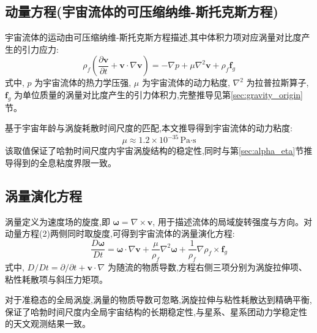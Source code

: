 \documentclass[11pt,a4paper]{article}
\def\grad{\nabla}
\def\curl{\nabla\times}
\begin{document}
\subsection{动量方程(宇宙流体的可压缩纳维-斯托克斯方程)}
宇宙流体的运动由可压缩纳维-斯托克斯方程描述,其中体积力项对应涡量对比度产生的引力应力:
\begin{equation}
\rho_f \left( \frac{\partial \boldsymbol{v}}{\partial t} + \boldsymbol{v} \cdot \grad \boldsymbol{v} \right) = - \grad p + \mu \grad^2 \boldsymbol{v} + \rho_f \boldsymbol{f}_g
\end{equation}
式中, $p$ 为宇宙流体的热力学压强, $\mu$ 为宇宙流体的动力粘度, $\grad^2$ 为拉普拉斯算子, $\boldsymbol{f}_g$ 为单位质量的涡量对比度产生的引力体积力,完整推导见第\ref{sec:gravity_origin}节。

基于宇宙年龄与涡旋耗散时间尺度的匹配,本文推导得到宇宙流体的动力粘度:
\begin{equation}
\mu \approx 1.2 \times 10^{-35} \, \text{Pa·s}
\end{equation}
该取值保证了哈勃时间尺度内宇宙涡旋结构的稳定性,同时与第\ref{sec:alpha_eta}节推导得到的全息粘度界限一致。

\subsection{涡量演化方程}
涡量定义为速度场的旋度,即 $\boldsymbol{\omega} = \curl \boldsymbol{v}$, 用于描述流体的局域旋转强度与方向。对动量方程(2)两侧同时取旋度,可得到宇宙流体的涡量演化方程:
\begin{equation}
\frac{D \boldsymbol{\omega}}{D t} = \boldsymbol{\omega} \cdot \grad \boldsymbol{v} + \frac{\mu}{\rho_f} \grad^2 \boldsymbol{\omega} + \frac{1}{\rho_f} \grad \rho_f \times \boldsymbol{f}_g
\end{equation}
式中, $D/Dt = \partial/\partial t + \boldsymbol{v}\cdot\grad$ 为随流的物质导数,方程右侧三项分别为涡旋拉伸项、粘性耗散项与斜压力矩项。

对于准稳态的全局涡旋,涡量的物质导数可忽略,涡旋拉伸与粘性耗散达到精确平衡,保证了哈勃时间尺度内全局宇宙结构的长期稳定性,与星系、星系团动力学稳定性的天文观测结果一致。
\end{document}
